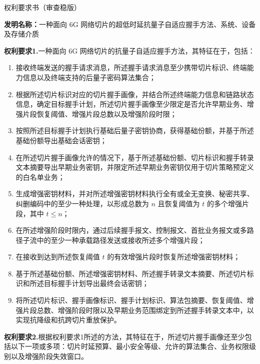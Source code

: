 \documentclass[12pt,a4paper]{article}
\begin{document}
\begin{center}
    {\Huge\heiti 权利要求书（审查稳版）}
\end{center}

\vspace{1em}

\noindent\textbf{发明名称：}一种面向 6G 网络切片的超低时延抗量子自适应握手方法、系统、设备及存储介质

\vspace{1em}

\textbf{权利要求1.}一种面向 6G 网络切片的抗量子自适应握手方法，其特征在于，包括：

\begin{enumerate}[label=\arabic*., leftmargin=2em]
    \item 接收终端发送的握手请求消息，所述握手请求消息至少携带切片标识、终端能力信息以及终端支持的后量子密码算法集合；
    \item 根据所述切片标识对应的切片握手画像，并结合所述终端能力信息和链路状态信息，确定目标握手计划，所述切片握手画像至少限定是否允许早期业务、增强片段恢复阈值、增强片段总数以及增强阶段时限；
    \item 按照所述目标握手计划执行基础后量子密钥协商，获得基础份额，并基于所述基础份额导出基础会话密钥；
    \item 在所述切片握手画像允许的情况下，基于所述基础份额、切片标识和握手转录文本摘要导出早期业务密钥，并限定所述早期业务密钥仅用于切片策略预定义的白名单业务；
    \item 生成增强密钥材料，并对所述增强密钥材料执行全有或全无变换、秘密共享、纠删编码中的至少一种处理，以形成总数为 $n$ 且恢复阈值为 $t$ 的多个增强片段，其中 $t \leq n$；
    \item 在所述增强阶段时限内，通过后续握手报文、控制报文、首批业务报文或多路径子流中的至少一种承载路径发送或接收所述多个增强片段；
    \item 在接收到达到所述恢复阈值 $t$ 的有效增强片段时恢复所述增强密钥材料；
    \item 基于所述基础份额、所述增强密钥材料、所述握手转录文本摘要、所述切片标识和所述目标握手计划导出最终会话密钥；
    \item 将所述切片标识、握手画像标识、握手计划标识、算法包摘要、恢复阈值、增强片段总数、增强阶段时限以及早期业务范围绑定到所述握手转录文本中，以实现抗降级和抗跨切片重放保护。
\end{enumerate}

\vspace{0.5cm}

\textbf{权利要求2.}根据权利要求1所述的方法，其特征在于，所述切片握手画像还至少包括以下一项或多项：切片时延预算、最小安全等级、允许的算法集合、业务权限级别以及增强阶段失效窗口。
\end{document}
